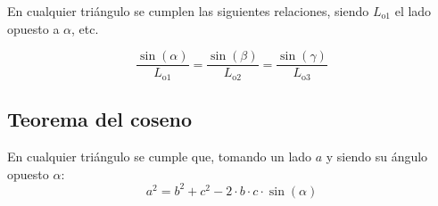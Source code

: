 En cualquier triángulo se cumplen las siguientes relaciones, siendo $L_{\text{o1}}$ el lado opuesto a $\alpha$, etc.

$$
\dfrac{\sin(\alpha)}{L_{\text{o1}}} = 
\dfrac{\sin(\beta)}{L_{\text{o2}}} = 
\dfrac{\sin(\gamma)}{L_{\text{o3}}}
$$


\subsection*{Teorema del coseno}

En cualquier triángulo se cumple que, tomando un lado $a$ y siendo su ángulo opuesto $\alpha$:
$$a^2=b^2 + c^2 - 2\cdot b \cdot c \cdot \sin(\alpha)$$
